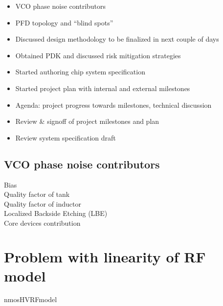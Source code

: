 \documentclass{article}
\begin{document}
\begin{itemize}
	\item VCO phase noise contributors
	\item PFD topology and “blind spots”
	\item Discussed design methodology to be finalized in next couple of days
	\item Obtained PDK and discussed risk mitigation strategies
	\item Started authoring chip system specification
	\item Started project plan with internal and external milestones
	\item Agenda: project progress towards milestones, technical discussion
	\item Review \& signoff of project milestones and plan
	\item Review system specification draft 
\end{itemize}

\subsection{VCO phase noise contributors}

Bias %
\\
Quality factor of tank %
\\
Quality factor of inductor
\\
Localized Backside Etching (LBE)
\\
Core devices contribution 


\section{Problem with linearity of RF model}


nmosHVRFmodel 
\end{document}
